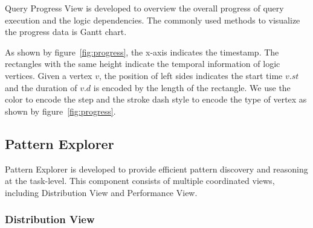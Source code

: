 Query Progress View is developed to overview the overall progress of query execution and the logic dependencies. 
The commonly used methods to visualize the progress data is Gantt chart.

As shown by figure~\ref{fig:progress}, the x-axis indicates the timestamp. The rectangles with the same  height indicate the temporal information of logic vertices. Given a vertex $v$, the position of left sides indicates the start time $v.st$ and the duration of $v.d$ is encoded by the length of the rectangle. We use the color to encode the step and the stroke dash style to encode the type of vertex as shown by figure~\ref{fig:progress}.


\subsection{Pattern Explorer}

Pattern Explorer is developed to provide efficient pattern discovery and reasoning at the task-level. This component consists of multiple coordinated views, including Distribution View and Performance View.
\subsubsection{Distribution View}

